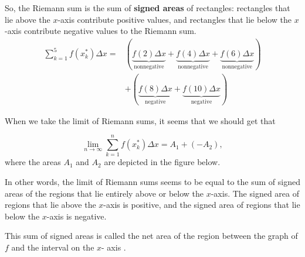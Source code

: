 \documentclass{ximera}
\begin{document}
\begin{example}
So, the Riemann sum is the sum of \textbf{signed areas} of rectangles:
rectangles that lie above the $x$-axis contribute positive values, and
rectangles that lie below the $x$-axis contribute negative values to
the Riemann sum.
\begin{align*}
  \sum_{k=1}^5 f(x_k^*)\Delta x= &\left(\underbrace{f(2)\Delta x}_{\text{nonnegative}}+  \underbrace{f(4)\Delta x}_{\text{nonnegative}}+  \underbrace{f(6)\Delta x}_{\text{nonnegative}}\right)\\
  &+ \left(\underbrace{f(8)\Delta x}_{\text{negative}}+  \underbrace{f(10)\Delta x}_{\text{negative}}\right)
\end{align*}
 \end{example}

 When we take the limit of Riemann sums, it seems that we should get that
 
 \[
\lim_{n\to\infty}\sum_{k=1}^n f(x_k^*)\Delta x= A_1+(-A_2),
\]
where the areas $A_1$ and $A_2$ are depicted in the figure below. 

In other words, the limit of Riemann sums seems to be equal to the sum of signed areas of the regions that lie entirely above  or below  the $x$-axis.
The signed area of  regions that lie above the $x$-axis is positive, and the signed area of regions that lie below the $x$-axis is negative.

This sum of signed areas is called the net area of the region  between the graph of $f$ and the interval on the $x$- axis .
 \begin{image}
\end{image}
\end{document}
